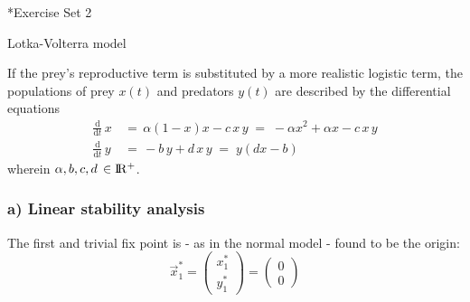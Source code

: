 \documentclass[11pt,headinclude,bibliography=totocnumbered,english,parskip=half-]{scrartcl}
\renewcommand{\d}{\text{d}}
\newcommand{\f}{\frac}
\begin{document}
\setcounter{section}{1}
\begin{section}*{Exercise Set 2}

\begin{subsection}{Lotka-Volterra model}

If the prey's reproductive term is substituted by a more realistic logistic term, the populations of prey $x(t)$ and predators $y(t)$ are described by the differential equations
\begin{align*}
  \f{\d}{\d t}\,x\,&=\, \alpha (1-x) x - c\,x\,y \; = \; -\alpha x^2 + \alpha x - c\,x\,y\\
  \f{\d}{\d t}\,y\,&=\, -b\,y + d\,x\,y \;=\;y(d x -b)
\end{align*}
wherein $\alpha,b,c,d \,\in \rm I\!R^+$. \\
\subsubsection*{a) Linear stability analysis}
The first and trivial fix point is - as in the normal model - found to be the origin:
$$
\vec{x}^*_1=
\begin{pmatrix}
x^*_1\\
y^*_1
\end{pmatrix}=
\begin{pmatrix}
0\\
0
\end{pmatrix}
$$


\end{subsection}
\end{section}
\end{document}

